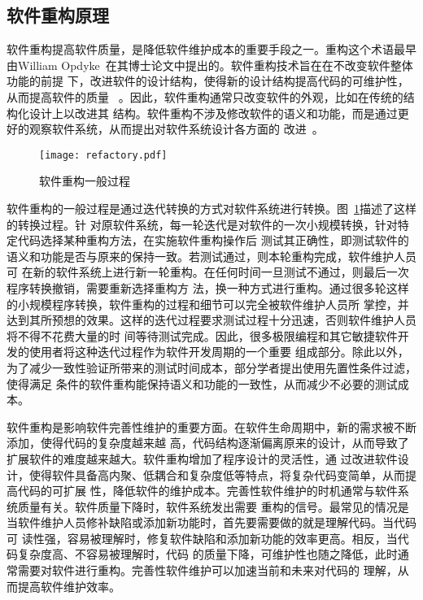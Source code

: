 \subsection{软件重构原理}
软件重构提高软件质量，是降低软件维护成本的重要手段之一。重构这个术语最早由William
Opdyke~\cite{opdyke1992refactoring}在其博士论文中提出的。软件重构技术旨在在不改变软件整体功能的前提
下，改进软件的设计结构，使得新的设计结构提高代码的可维护性，从而提高软件的质量
~\cite{fowler1999refactoring}。因此，软件重构通常只改变软件的外观，比如在传统的结构化设计上以改进其
结构。软件重构不涉及修改软件的语义和功能，而是通过更好的观察软件系统，从而提出对软件系统设计各方面的
改进~\cite{chikofsky1990reverse}。

\begin{figure}
  \centering
  \texttt{[image: refactory.pdf]}  
  \caption{\label{fig:refactory}软件重构一般过程}
\end{figure}

软件重构的一般过程是通过迭代转换的方式对软件系统进行转换。图~\ref{fig:refactory}描述了这样的转换过程。针
对原软件系统，每一轮迭代是对软件的一次小规模转换，针对特定代码选择某种重构方法，在实施软件重构操作后
测试其正确性，即测试软件的语义和功能是否与原来的保持一致。若测试通过，则本轮重构完成，软件维护人员可
在新的软件系统上进行新一轮重构。在任何时间一旦测试不通过，则最后一次程序转换撤销，需要重新选择重构方
法，换一种方式进行重构。通过很多轮这样的小规模程序转换，软件重构的过程和细节可以完全被软件维护人员所
掌控，并达到其所预想的效果。这样的迭代过程要求测试过程十分迅速，否则软件维护人员将不得不花费大量的时
间等待测试完成。因此，很多极限编程和其它敏捷软件开发的使用者将这种迭代过程作为软件开发周期的一个重要
组成部分。除此以外，为了减少一致性验证所带来的测试时间成本，部分学者提出使用先置性条件过滤，使得满足
条件的软件重构能保持语义和功能的一致性，从而减少不必要的测试成本。

软件重构是影响软件完善性维护的重要方面。在软件生命周期中，新的需求被不断添加，使得代码的复杂度越来越
高，代码结构逐渐偏离原来的设计，从而导致了扩展软件的难度越来越大。软件重构增加了程序设计的灵活性，通
过改进软件设计，使得软件具备高内聚、低耦合和复杂度低等特点，将复杂代码变简单，从而提高代码的可扩展
性，降低软件的维护成本。完善性软件维护的时机通常与软件系统质量有关。软件质量下降时，软件系统发出需要
重构的信号。最常见的情况是当软件维护人员修补缺陷或添加新功能时，首先要需要做的就是理解代码。当代码可
读性强，容易被理解时，修复软件缺陷和添加新功能的效率更高。相反，当代码复杂度高、不容易被理解时，代码
的质量下降，可维护性也随之降低，此时通常需要对软件进行重构。完善性软件维护可以加速当前和未来对代码的
理解，从而提高软件维护效率。

